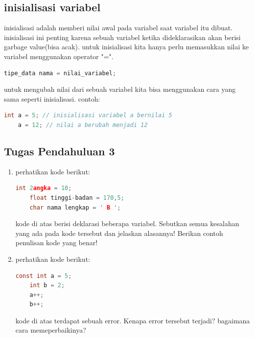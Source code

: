 \subsection*{inisialisasi variabel}

inisialisasi adalah memberi nilai awal pada variabel saat variabel itu dibuat.
inisialisasi ini penting karena sebuah variabel ketika dideklarasikan akan berisi garbage value(bisa acak).
untuk inisialisasi kita hanya perlu memasukkan nilai ke variabel menggunakan operator "=".
{
\captionsetup[lstlisting]{labelformat=empty, justification=raggedright, singlelinecheck=false} %
\begin{lstlisting}[language=c, caption={syntax}]
	tipe_data nama = nilai_variabel;
\end{lstlisting}
}
untuk mengubah nilai dari sebuah variabel kita bisa menggunakan cara yang sama seperti inisialisasi.
contoh:
\begin{lstlisting}[language=c]
	int a = 5; // inisialisasi variabel a bernilai 5
	a = 12; // nilai a berubah menjadi 12
\end{lstlisting}

\subsection*{Tugas Pendahuluan 3}
\begin{enumerate}
	\item perhatikan kode berikut:
	\begin{lstlisting}[language=c]
	int 2angka = 10;
	float tinggi-badan = 170,5;
	char nama lengkap = ' B ';
\end{lstlisting}
	kode di atas berisi deklarasi beberapa variabel.
	Sebutkan semua kesalahan yang ada pada kode tersebut dan jelaskan alasannya!
	Berikan contoh penulisan kode yang benar!
	\item perhatikan kode berikut:
	\begin{lstlisting}[language=c]
	const int a = 5;
	int b = 2;
	a++;
	b++;
\end{lstlisting}
	kode di atas terdapat sebuah error. Kenapa error tersebut terjadi? bagaimana cara memeperbaikinya?
\end{enumerate}

